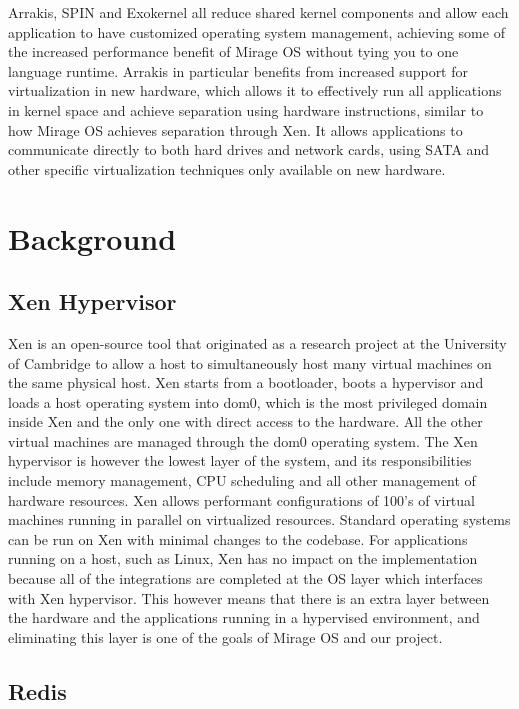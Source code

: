 \documentclass[english,10pt,twocolumn]{article}
\begin{document}
Arrakis\cite{arrakis}, SPIN\cite{spin} and Exokernel\cite{exokernel} all reduce shared kernel components and allow each application to have customized operating system management, achieving some of the increased performance benefit of Mirage OS without tying you to one language runtime.
Arrakis in particular benefits from increased support for virtualization in new hardware, which allows it to effectively run all applications in kernel space and achieve separation using hardware instructions, similar to how Mirage OS achieves separation through Xen.
It allows applications to communicate directly to both hard drives and network cards, using SATA and other specific virtualization techniques only available on new hardware.

\section{Background}

\subsection{Xen Hypervisor}

Xen is an open-source tool that originated as a research project at the University of Cambridge to allow a host to simultaneously host many virtual machines on the same physical host.
Xen starts from a bootloader, boots a hypervisor and loads a host operating system into dom0, which is the most privileged domain inside Xen and the only one with direct access to the hardware.
All the other virtual machines are managed through the dom0 operating system.
The Xen hypervisor is however the lowest layer of the system, and its responsibilities include memory management, CPU scheduling and all other management of hardware resources.
Xen allows performant configurations of 100's of virtual machines running in parallel on virtualized resources.
Standard operating systems can be run on Xen with minimal changes to the codebase.
For applications running on a host, such as Linux, Xen has no impact on the implementation because all of the integrations are completed at the OS layer which interfaces with Xen hypervisor.
This however means that there is an extra layer between the hardware and the applications running in a hypervised environment, and eliminating this layer is one of the goals of Mirage OS and our project.

\subsection{Redis}
\end{document}
